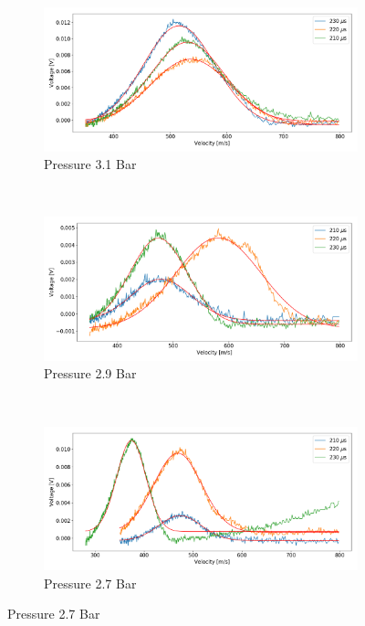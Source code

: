 \documentclass[a4paper,10pt]{article}
\begin{document}
\begin{figure}[H]
  \centering{}
  \begin{subfigure}[t]{0.49 \textwidth}
    \centering
    \includegraphics[width= \textwidth]{tof21}
    \caption{Pressure 3.1 Bar}\label{tof1}
  \end{subfigure}
  ~
  \begin{subfigure}[t]{0.49 \textwidth}
    \centering
    \includegraphics[width=\textwidth]{tof19}
    \caption{Pressure 2.9 Bar}\label{tof2}
  \end{subfigure}
  ~
  \begin{subfigure}[t]{0.49 \textwidth}
    \centering
    \includegraphics[width=\textwidth]{tof17}
    \caption{Pressure 2.7 Bar}\label{tof3}
  \end{subfigure}

\end{figure}
\end{document}
